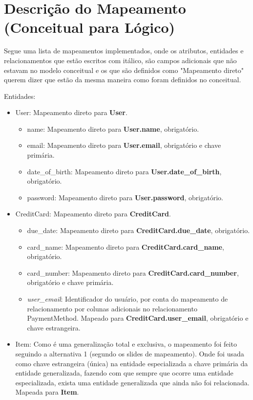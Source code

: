 \documentclass[a4paper, 11pt]{article}
\begin{document}
\newpage
\section*{Descrição do Mapeamento (Conceitual para Lógico)}

Segue uma lista de mapeamentos implementados, onde os atributos, entidades e relacionamentos que estão escritos com  itálico, são campos adicionais que não estavam no modelo conceitual e os que são definidos como "Mapeamento direto" querem dizer que estão da mesma maneira como foram definidos no conceitual.

Entidades:
\begin{itemize}
    \item User: Mapeamento direto para {\textbf{User}}.
    \begin{itemize}
        \item name: Mapeamento direto para {\textbf{User.name}}, obrigatório.
        \item email: Mapeamento direto para {\textbf{User.email}}, obrigatório e chave primária.
        \item date\_of\_birth: Mapeamento direto para {\textbf{User.date\_of\_birth}}, obrigatório.
        \item password: Mapeamento direto para {\textbf{User.password}}, obrigatório.
    \end{itemize}
    \item CreditCard: Mapeamento direto para {\textbf{CreditCard}}.
    \begin{itemize}
        \item due\_date: Mapeamento direto para {\textbf{CreditCard.due\_date}}, obrigatório.
        \item card\_name: Mapeamento direto para {\textbf{CreditCard.card\_name}}, obrigatório.
        \item card\_number: Mapeamento direto para {\textbf{CreditCard.card\_number}}, obrigatório e chave primária.
        \item{\textit{user\_email}}: Identificador do usuário, por conta do mapeamento de relacionamento por colunas adicionais no relacionamento PaymentMethod. Mapeado para {\textbf{CreditCard.user\_email}}, obrigatório e chave estrangeira.
    \end{itemize}
    \item Item: Como é uma generalização total e exclusiva, o mapeamento foi feito seguindo a alternativa 1 (segundo os slides de mapeamento). Onde foi usada como chave estrangeira (única) na entidade especializada a chave primária da entidade generalizada, fazendo com que sempre que ocorre uma entidade especializada, exista uma entidade generalizada que ainda não foi relacionada. Mapeada para {\textbf{Item}}.

\end{itemize}
\end{document}
